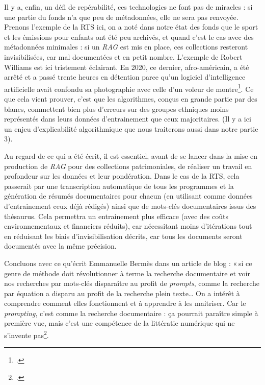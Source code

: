 Il y a, enfin, un défi de repérabilité, ces technologies ne font pas de miracles : si une partie du fonds n’a que peu de métadonnées, elle ne sera pas renvoyée. Prenons l’exemple de la RTS ici, on a noté dans notre état des fonds que le sport et les émissions pour enfants ont été peu archivés, et quand c’est le cas avec des métadonnées minimales : si un \textit{RAG} est mis en place, ces collections resteront invisibilisées, car mal documentées et en petit nombre. L’exemple de Robert Williams est ici tristement éclairant. En 2020, ce dernier, afro-américain, a été arrêté et a passé trente heures en détention parce qu’un logiciel d’intelligence artificielle avait confondu sa photographie avec celle d’un voleur de montre\footcite{noauthor_etats-unis_nodate}. Ce que cela vient prouver, c’est que les algorithmes, conçus en grande partie par des blancs, commettent bien plus d’erreurs sur des groupes ethniques moins représentés dans leurs données d’entrainement que ceux majoritaires. (Il y a ici un enjeu d’explicabilité algorithmique que nous traiterons aussi dans notre partie 3).

Au regard de ce qui a été écrit, il est essentiel, avant de se lancer dans la mise en production de \textit{RAG} pour des collections patrimoniales, de réaliser un travail en profondeur sur les données et leur pondération. Dans le cas de la RTS, cela passerait par une transcription automatique de tous les programmes et la génération de résumés documentaires pour chacun (en utilisant comme données d’entrainement ceux déjà rédigés) ainsi que de mots-clés documentaires issus des thésaurus. Cela permettra un entrainement plus efficace (avec des coûts environnementaux et financiers réduits), car nécessitant moins d’itérations tout en réduisant les biais d’invisibilisation décrits, car tous les documents seront documentés avec la même précision.

Concluons avec ce qu’écrit Emmanuelle Bermès dans un article de blog : « si ce genre de méthode doit révolutionner à terme la recherche documentaire et voir nos recherches par mots-clés disparaître au profit de \textit{prompts}, comme la recherche par équation a disparu au profit de la recherche plein texte… On a intérêt à comprendre comment elles fonctionnent et à apprendre à les maitriser. Car le \textit{prompting}, c’est comme la recherche documentaire : ça pourrait paraître simple à première vue, mais c’est une compétence de la littératie numérique qui ne s’invente pas\footcite{bermes_futur_2024}.

